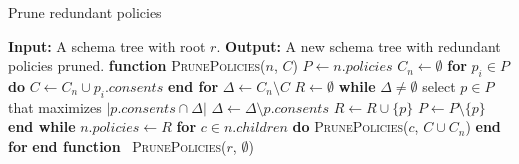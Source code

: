 \begin{algorithm}
    \caption{Prune redundant policies}
    \label{alg:policy_pruning}
    \begin{algorithmic}
        \STATE \textbf{Input:} A schema tree with root $r$.
        \STATE \textbf{Output:} A new schema tree with redundant policies pruned.
        \STATE \textbf{function} \textsc{PrunePolicies}($n$, $C$)
        \STATE \hspace{1em} $P \gets n.policies$ \hfill {}
        \STATE \hspace{1em} $C_n \gets \emptyset$ \hfill {}
        \STATE \hspace{1em} \textbf{for} $p_i \in P$ \textbf{do}
        \STATE \hspace{2em} $C \gets C_n \cup p_i.consents$ 
        \STATE \hspace{1em} \textbf{end for}
        \STATE \hspace{1em} $\Delta \gets C_n \setminus C$ \hfill {}
        \STATE \hspace{1em} $R \gets \emptyset$ \hfill {}
        \STATE \hspace{1em} \textbf{while} $\Delta \neq \emptyset$
        \STATE \hspace{2em} select $p \in P$ that maximizes $|p.consents \cap \Delta|$
        \STATE \hspace{2em} $\Delta \gets \Delta \setminus p.consents$
        \STATE \hspace{2em} $R \gets R \cup \lbrace p \rbrace$
        \STATE \hspace{2em} $P \gets P \setminus \lbrace p \rbrace$
        \STATE \hspace{1em} \textbf{end while}
        \STATE \hspace{1em} $n.policies \gets R$ \hfill {}
        \STATE \hspace{1em} \textbf{for} $c \in n.children$ \textbf{do}
        \STATE \hspace{2em} \textsc{PrunePolicies}($c$, $C \cup C_n$)
        \STATE \hspace{1em} \textbf{end for}
        \STATE \textbf{end function} 
        \STATE \textsc{PrunePolicies}($r$, $\emptyset$)
    \end{algorithmic}
\end{algorithm}

